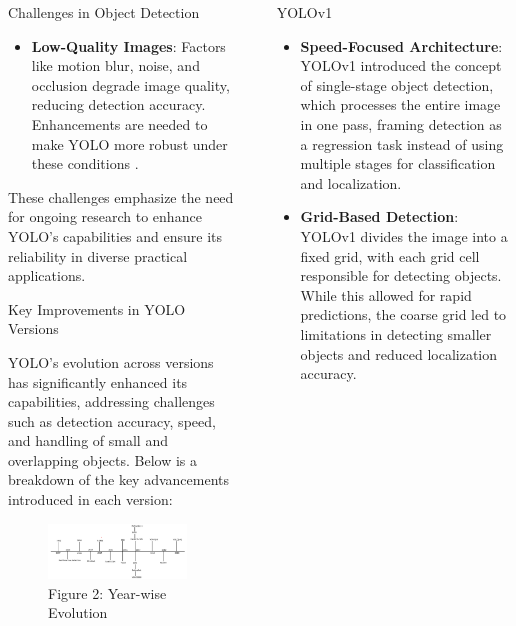 \documentclass[final]{beamer}
\newlength{\sepwidth}
\newlength{\colwidth}
\newcommand{\separatorcolumn}{\begin{column}{\sepwidth}\end{column}}
\begin{document}
\begin{frame}[t]
\begin{columns}[t]
\begin{column}{\colwidth}
\begin{block}{Challenges in Object Detection}
\begin{itemize}
      \item \textbf{Low-Quality Images}: Factors like motion blur, noise, and occlusion degrade image quality, reducing detection accuracy. Enhancements are needed to make YOLO more robust under these conditions \cite{6}.
    \end{itemize}

    These challenges emphasize the need for ongoing research to enhance YOLO’s capabilities and ensure its reliability in diverse practical applications.
\end{block}

\begin{block}{Key Improvements in YOLO Versions}
    \vspace{0.6cm} %

    YOLO’s evolution across versions has significantly enhanced its capabilities, addressing challenges such as detection accuracy, speed, and handling of small and overlapping objects. Below is a breakdown of the key advancements introduced in each version:

 \begin{figure}
    \centering
    \includegraphics[width=0.95\textwidth]{logos/year.png}
    \caption{Figure 2: Year-wise Evolution}
    \label{fig:arch}
\end{figure}

\end{block}


\end{column}

\separatorcolumn

\begin{column}{\colwidth}


\begin{block}{YOLOv1}
    \begin{itemize}
      \item \textbf{Speed-Focused Architecture}: YOLOv1 introduced the concept of single-stage object detection, which processes the entire image in one pass, framing detection as a regression task instead of using multiple stages for classification and localization.
      \item \textbf{Grid-Based Detection}: YOLOv1 divides the image into a fixed grid, with each grid cell responsible for detecting objects. While this allowed for rapid predictions, the coarse grid led to limitations in detecting smaller objects and reduced localization accuracy.
    \end{itemize}
\end{block}


\end{column}
\end{columns}
\end{frame}
\end{document}
